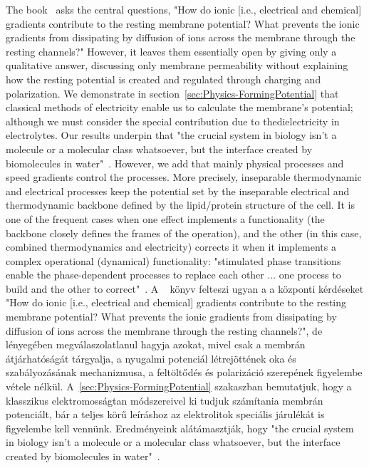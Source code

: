 \ifx\magyar\undefined %
The book~\cite{PrinciplesNeuralScience:2013} asks the central questions, "How do ionic [i.e., electrical and chemical] gradients contribute to the resting membrane potential? What prevents
the ionic gradients from dissipating by diffusion of
ions across the membrane through the resting channels?"
However, it leaves them essentially open by giving only a qualitative answer, discussing only membrane permeability without explaining how the resting potential is created and regulated through charging and polarization.
%
We demonstrate in section~\ref{sec:Physics-FormingPotential} that classical methods of electricity enable us to calculate the membrane's potential; although we must consider the special contribution due to thedielectricity in electrolytes.
Our results underpin that "the crucial system in biology isn't a molecule or a molecular class whatsoever, but the interface created by biomolecules in water"~\cite{LivingSystemPhysics:2021}. However, we add that mainly
physical processes and speed gradients control the processes.
More precisely, inseparable thermodynamic and electrical processes keep the potential set by the inseparable electrical and thermodynamic backbone defined by the lipid/protein structure of the cell. It is one of the frequent cases when 
one effect implements a functionality (the backbone closely defines the frames of the operation), and the other (in this case, combined thermodynamics and electricity) corrects it when it implements a complex operational (dynamical) functionality:
"stimulated phase transitions enable the phase-dependent processes to replace each other ... one process to build and the other
to correct"~\cite{BiologicalConservationLaw:2017}.
\else
A ~\cite{PrinciplesNeuralScience:2013} könyv felteszi ugyan 
a a központi kérdéseket  "How do ionic [i.e., electrical and chemical] gradients contribute to the resting membrane potential? What prevents
the ionic gradients from dissipating by diffusion of
ions across the membrane through the resting channels?",
de lényegében megválaszolatlanul hagyja azokat, mivel csak
a membrán átjárhatóságát tárgyalja, a nyugalmi potenciál 
létrejöttének oka és szabályozásának mechanizmusa,
a feltöltődés és  polarizáció szerepének figyelembe vétele nélkül.
%
A~\ref{sec:Physics-FormingPotential} szakaszban bemutatjuk,
hogy a klasszikus elektromosságtan módszereivel
ki tudjuk számítania membrán potenciált, bár a teljes
körű leíráshoz az elektrolitok speciális járulékát is
figyelembe kell vennünk.
Eredményeink alátámasztják, hogy "the crucial system in biology isn't a molecule or a molecular class whatsoever, but the interface created by biomolecules in water"~\cite{LivingSystemPhysics:2021}. 
